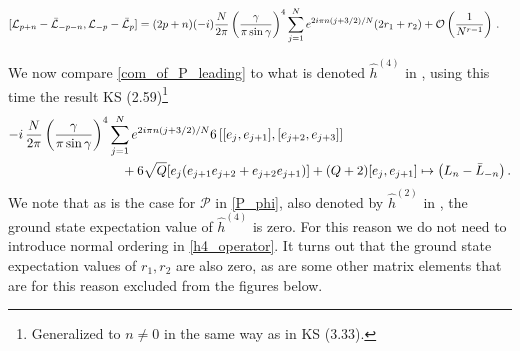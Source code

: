 \documentclass[a4paper,10pt]{article}
\newcommand{\linnea}[1]{$\framebox{\tiny L}$\ \textbf{\texttt{{\color{red}\footnotesize#1}}}}
\newcommand{\Platt}{\mathcal{P}}
\newcommand{\KSgen}{\mathcal{L}}
\begin{document}
\begin{equation}\label{com_of_P_leading}
\begin{split}
&[\KSgen_{p+n}-\bar{\KSgen}_{-p-n},\KSgen_{-p}-\bar{\KSgen}_{p}] 
 =  (2p+ n) (-i)   {N\over2\pi} 
\left( \frac{\gamma}{\pi \sin \gamma} \right)^4  \sum_{j=1}^{N} e^{2i\pi n (j+3/2)/N} ( 
 2 r_1  + r_2) +\mathcal{O}\left({1\over N^{r-1}}\right)\,.
%
\end{split}
\end{equation}


We now compare \eqref{com_of_P_leading} to what is denoted $\hat{h}^{(4)}$ in \cite{KooSaleur}, using this time the result KS (2.59)\footnote{Generalized to $n\neq 0$ in the same way as in KS (3.33).} %
\begin{equation}\label{h4_operator}
\begin{split}
-i\, {N\over2\pi}\left({\gamma\over\pi\sin\gamma}\right)^4 &\sum_{j=1}^{N}e^{2i\pi n(j+3/2)/N}  6\,[[e_j,e_{j+1}],[e_{j+2},e_{j+3}]] \\
 &\quad+ 6\sqrt{Q}[e_j(e_{j+1}e_{j+2} + e_{j+2}e_{j+1})] + (Q+2)[e_j,e_{j+1}] 
%
\mapsto  \left( L_n - \bar{L}_{-n}   \right) .
\end{split}
\end{equation}
We note that as is the case for $\Platt$ in \eqref{P_phi}, also denoted by $\hat{h}^{(2)}$ in \cite{KooSaleur}, the ground state expectation value of $\hat{h}^{(4)}$ is zero. For this reason we do not need to introduce normal ordering in \eqref{h4_operator}. It turns out that the ground state expectation values of $r_1, r_2$ are also zero, as are some other matrix elements that are for this reason excluded from the figures below. 


\end{document}
